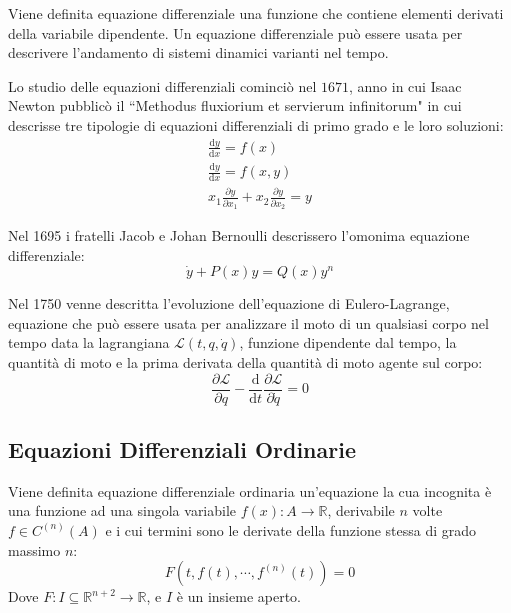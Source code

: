 \documentclass{article}
\numberwithin{equation}{subsection}
\newcommand{\df}{\mathrm{d}}
\begin{document}
Viene definita equazione differenziale una funzione che contiene elementi derivati della variabile dipendente. 
Un equazione differenziale può essere usata per descrivere l'andamento di sistemi dinamici varianti nel tempo. 


Lo studio delle equazioni differenziali cominciò nel $1671$, anno in cui Isaac Newton pubblicò il ``Methodus fluxiorium et servierum infinitorum" in cui descrisse tre 
tipologie di equazioni differenziali di primo grado e le loro soluzioni: 
\begin{gather*}
    \displaystyle\frac{\df y}{\df x}=f(x)\\
    \displaystyle\frac{\df y}{\df x}=f(x,y)\\
    x_1\displaystyle\frac{\partial y}{\partial x_1}+x_2\frac{\partial y}{\partial x_2}=y
\end{gather*}



Nel 1695 i fratelli Jacob e Johan Bernoulli descrissero l'omonima equazione differenziale:
\begin{equation*}
    \dot y+P(x)y=Q(x)y^n
\end{equation*}



Nel 1750 venne descritta l'evoluzione dell'equazione di Eulero-Lagrange, equazione che può essere usata per analizzare il moto di un qualsiasi corpo nel tempo data la 
lagrangiana $\mathcal{L}(t,q,\dot q)$, funzione dipendente dal tempo, la quantità di moto e la prima derivata della quantità di moto agente sul corpo:
\begin{equation*}
    \displaystyle\frac{\partial \mathcal{L}}{\partial q}-\frac{\df}{\df t}\frac{\partial \mathcal{L}}{\partial\dot q}=0
\end{equation*}

\subsection{Equazioni Differenziali Ordinarie}

Viene definita equazione differenziale ordinaria un'equazione la cua incognita è una funzione ad una singola variabile $f(x):A\to\mathbb{R}$, derivabile $n$ volte $f\in C^{(n)}(A)$ 
e i cui termini sono le derivate della funzione stessa di grado massimo $n$: 
\begin{equation}
    F(t,f(t),\cdots,f^{(n)}(t))=0
\end{equation}
Dove $F:I\subseteq\mathbb{R}^{n+2}\to\mathbb{R}$, e $I$ è un insieme aperto. 
\end{document}
